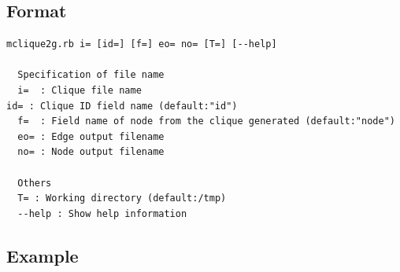 \subsection{Format}
\begin{verbatim}
mclique2g.rb i= [id=] [f=] eo= no= [T=] [--help]

  Specification of file name 
  i=  : Clique file name
id= : Clique ID field name (default:"id")
  f=  : Field name of node from the clique generated (default:"node")
  eo= : Edge output filename 
  no= : Node output filename 

  Others
  T= : Working directory (default:/tmp)
  --help : Show help information 
\end{verbatim}

\subsection{Example}


